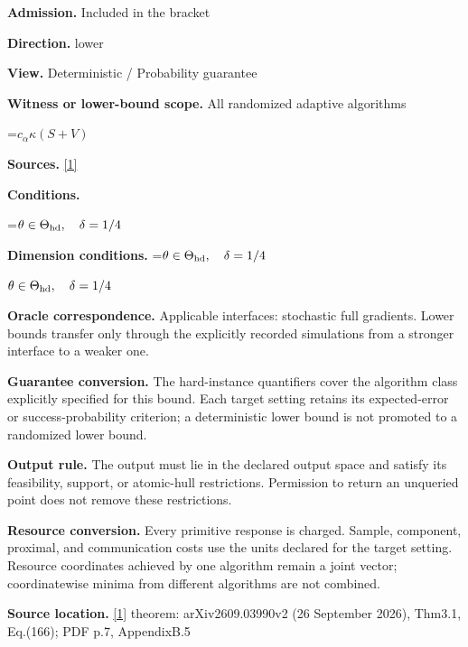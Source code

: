 \documentclass[10pt,a4paper]{article}
\newcommand{\AtlasMath}[1]{\par\begingroup\centering\setbox0=\hbox{$\displaystyle #1$}\ifdim\wd0>1.4\linewidth\typeout{ATLAS WIDE FORMULA: \the\wd0}\fi\ifdim\wd0>\linewidth\resizebox{\linewidth}{!}{\box0}\else\box0\fi\par\endgroup}
\newcommand{\AtlasInlineMath}[1]{\begingroup\setbox0=\hbox{$#1$}\ifdim\wd0>.4\linewidth\endgroup\AtlasMath{#1}\else\endgroup$#1$\fi}
\begin{document}
\textbf{Admission.} Included in the bracket



\textbf{Direction.} lower



\textbf{View.} Deterministic / Probability guarantee



\textbf{Witness or lower-bound scope.} All randomized adaptive algorithms



\AtlasMath{c_\alpha\kappa(S+V)}


\textbf{Sources.} \href{https://arxiv.org/pdf/2609.03990}{[1]}



\textbf{Conditions.}
\AtlasMath{\theta\in\Theta_{\rm hd},\quad\delta=1/4}




\textbf{Dimension conditions.} \AtlasInlineMath{\theta\in\Theta_{\rm hd},\quad\delta=1/4}



\textbf{Oracle correspondence.} Applicable interfaces: stochastic full gradients. Lower bounds transfer only through the explicitly recorded simulations from a stronger interface to a weaker one.



\textbf{Guarantee conversion.} The hard-instance quantifiers cover the algorithm class explicitly specified for this bound. Each target setting retains its expected-error or success-probability criterion; a deterministic lower bound is not promoted to a randomized lower bound.



\textbf{Output rule.} The output must lie in the declared output space and satisfy its feasibility, support, or atomic-hull restrictions. Permission to return an unqueried point does not remove these restrictions.



\textbf{Resource conversion.} Every primitive response is charged. Sample, component, proximal, and communication costs use the units declared for the target setting. Resource coordinates achieved by one algorithm remain a joint vector; coordinatewise minima from different algorithms are not combined.



\textbf{Source location.} \href{https://arxiv.org/pdf/2609.03990}{[1]} theorem: arXiv2609.03990v2 (26 September 2026), Thm3.1, Eq.(166); PDF p.7, AppendixB.5
\end{document}
